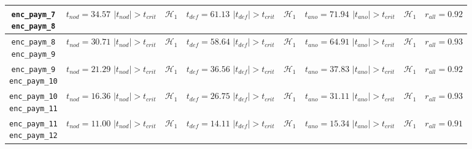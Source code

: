 \begin{table}[H]
{\begin{tabular}{|c|c|c|c|c|c|c|c|}
		\specialcell{\texttt{enc\_paym\_7}\\\texttt{enc\_paym\_8}} &
		\specialcell{$t_{nod} = 34.57$\\$|t_{nod}| > t_{crit}$} & $\mathcal{H}_1$ &
		\specialcell{$t_{def} = 61.13$\\$|t_{def}| > t_{crit}$} & $\mathcal{H}_1$ &
		\specialcell{$t_{ano} = 71.94$\\$|t_{ano}| > t_{crit}$} & $\mathcal{H}_1$ &
		$r_{all} = 0.92$ \\ \hline
		
		\specialcell{\texttt{enc\_paym\_8}\\\texttt{enc\_paym\_9}} &
		\specialcell{$t_{nod} = 30.71$\\$|t_{nod}| > t_{crit}$} & $\mathcal{H}_1$ &
		\specialcell{$t_{def} = 58.64$\\$|t_{def}| > t_{crit}$} & $\mathcal{H}_1$ &
		\specialcell{$t_{ano} = 64.91$\\$|t_{ano}| > t_{crit}$} & $\mathcal{H}_1$ &
		$r_{all} = 0.93$ \\ \hline
		
		\specialcell{\texttt{enc\_paym\_9}\\\texttt{enc\_paym\_{10}}} &
		\specialcell{$t_{nod} = 21.29$\\$|t_{nod}| > t_{crit}$} & $\mathcal{H}_1$ &
		\specialcell{$t_{def} = 36.56$\\$|t_{def}| > t_{crit}$} & $\mathcal{H}_1$ &
		\specialcell{$t_{ano} = 37.83$\\$|t_{ano}| > t_{crit}$} & $\mathcal{H}_1$ &
		$r_{all} = 0.92$ \\ \hline
		
		\specialcell{\texttt{enc\_paym\_{10}}\\\texttt{enc\_paym\_{11}}} &
		\specialcell{$t_{nod} = 16.36$\\$|t_{nod}| > t_{crit}$} & $\mathcal{H}_1$ &
		\specialcell{$t_{def} = 26.75$\\$|t_{def}| > t_{crit}$} & $\mathcal{H}_1$ &
		\specialcell{$t_{ano} = 31.11$\\$|t_{ano}| > t_{crit}$} & $\mathcal{H}_1$ &
		$r_{all} = 0.93$ \\ \hline
		
		\specialcell{\texttt{enc\_paym\_{11}}\\\texttt{enc\_paym\_{12}}} &
		\specialcell{$t_{nod} = 11.00$\\$|t_{nod}| > t_{crit}$} & $\mathcal{H}_1$ &
		\specialcell{$t_{def} = 14.11$\\$|t_{def}| > t_{crit}$} & $\mathcal{H}_1$ &
		\specialcell{$t_{ano} = 15.34$\\$|t_{ano}| > t_{crit}$} & $\mathcal{H}_1$ &
		$r_{all} = 0.91$ \\ \hline
		

\end{tabular}}
\end{table}
